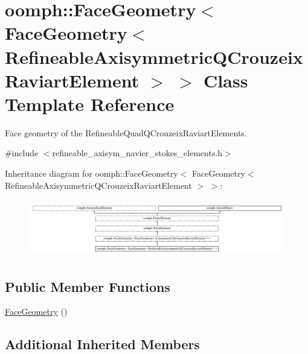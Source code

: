 \hypertarget{classoomph_1_1FaceGeometry_3_01FaceGeometry_3_01RefineableAxisymmetricQCrouzeixRaviartElement_01_4_01_4}{}\section{oomph\+:\+:Face\+Geometry$<$ Face\+Geometry$<$ Refineable\+Axisymmetric\+Q\+Crouzeix\+Raviart\+Element $>$ $>$ Class Template Reference}
\label{classoomph_1_1FaceGeometry_3_01FaceGeometry_3_01RefineableAxisymmetricQCrouzeixRaviartElement_01_4_01_4}


Face geometry of the Refineable\+Quad\+Q\+Crouzeix\+Raviart\+Elements.  




{\ttfamily \#include $<$refineable\+\_\+axisym\+\_\+navier\+\_\+stokes\+\_\+elements.\+h$>$}

Inheritance diagram for oomph\+:\+:Face\+Geometry$<$ Face\+Geometry$<$ Refineable\+Axisymmetric\+Q\+Crouzeix\+Raviart\+Element $>$ $>$\+:\begin{figure}[H]
\begin{center}
\leavevmode
\includegraphics[height=2.522522cm]{classoomph_1_1FaceGeometry_3_01FaceGeometry_3_01RefineableAxisymmetricQCrouzeixRaviartElement_01_4_01_4}
\end{center}
\end{figure}
\subsection*{Public Member Functions}
\begin{DoxyCompactItemize}
\item 
\hyperlink{classoomph_1_1FaceGeometry_3_01FaceGeometry_3_01RefineableAxisymmetricQCrouzeixRaviartElement_01_4_01_4_a28aa349f61b57f2ca237473b8f60deb9}{Face\+Geometry} ()
\end{DoxyCompactItemize}
\subsection*{Additional Inherited Members}


